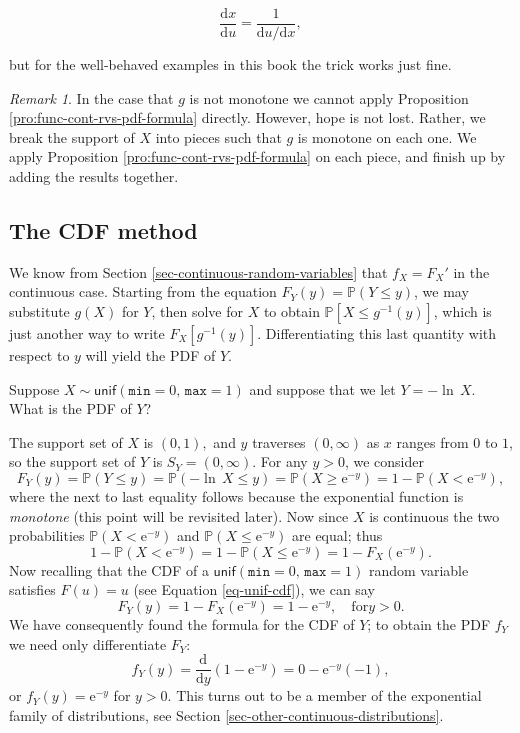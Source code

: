 \documentclass[]{book}
\numberwithin{equation}{chapter}
\numberwithin{figure}{chapter}
\theoremstyle{plain}
\theoremstyle{definition}
\theoremstyle{remark}
\theoremstyle{definition}
\theoremstyle{definition}
\theoremstyle{remark}
\newtheorem*{remark}{Remark}
\let\BeginKnitrBlock\begin \let\EndKnitrBlock\end
\begin{document}
\begin{equation}
\label{eq-univ-jacob-recip}
\frac{\mathrm{d} x}{\mathrm{d} u}=\frac{1}{\mathrm{d} u/\mathrm{d} x},
\end{equation}

but for the well-behaved examples in this book the trick works just
fine.

\bigskip

\begin{remark}
In the case that \(g\) is not monotone we cannot apply Proposition
\ref{pro:func-cont-rvs-pdf-formula} directly. However, hope is not lost.
Rather, we break the support of \(X\) into pieces such that \(g\) is
monotone on each one. We apply Proposition
\ref{pro:func-cont-rvs-pdf-formula} on each piece, and finish up by
adding the results together.
\end{remark}

\subsection{The CDF method}\label{the-cdf-method}

We know from Section \ref{sec-continuous-random-variables} that
\(f_{X}=F_{X}'\) in the continuous case. Starting from the equation
\(F_{Y}(y)=\mathbb{P}(Y\leq y)\), we may substitute \(g(X)\) for \(Y\),
then solve for \(X\) to obtain \(\mathbb{P}[X\leq g^{-1}(y)]\), which is
just another way to write \(F_{X}[g^{-1}(y)]\). Differentiating this
last quantity with respect to \(y\) will yield the PDF of \(Y\).

\bigskip

\BeginKnitrBlock{example}
\protect\hypertarget{ex:unnamed-chunk-281}{}{\label{ex:unnamed-chunk-281}}Suppose
\(X\sim\mathsf{unif}(\mathtt{min}=0,\,\mathtt{max}=1)\) and suppose that
we let \(Y=-\ln\, X\). What is the PDF of \(Y\)?
\EndKnitrBlock{example}

The support set of \(X\) is \((0,1),\) and \(y\) traverses
\((0,\infty)\) as \(x\) ranges from \(0\) to \(1\), so the support set
of \(Y\) is \(S_{Y}=(0,\infty)\). For any \(y>0\), we consider \[
F_{Y}(y)=\mathbb{P}(Y\leq y)=\mathbb{P}(-\ln\, X\leq
y)=\mathbb{P}(X\geq\mathrm{e}^{-y})=1-\mathbb{P}(X<\mathrm{e}^{-y}),
\] where the next to last equality follows because the exponential
function is \emph{monotone} (this point will be revisited later). Now
since \(X\) is continuous the two probabilities
\(\mathbb{P}(X<\mathrm{e}^{-y})\) and
\(\mathbb{P}(X\leq\mathrm{e}^{-y})\) are equal; thus \[ 1-\mathbb{P}(X
<
\mathrm{e}^{-y})=1-\mathbb{P}(X\leq\mathrm{e}^{-y})=1-F_{X}(\mathrm{e}^{-y}).
\] Now recalling that the CDF of a
\(\mathsf{unif}(\mathtt{min}=0,\,\mathtt{max}=1)\) random variable
satisfies \(F(u)=u\) (see Equation \eqref{eq-unif-cdf}), we can say \[
F_{Y}(y)=1-F_{X}(\mathrm{e}^{-y})=1-\mathrm{e}^{-y},\quad \mbox{for
}y>0.  \] We have consequently found the formula for the CDF of \(Y\);
to obtain the PDF \(f_{Y}\) we need only differentiate \(F_{Y}\): \[
f_{Y}(y)=\frac{\mathrm{d}}{\mathrm{d}
y}\left(1-\mathrm{e}^{-y}\right)=0-\mathrm{e}^{-y}(-1), \] or
\(f_{Y}(y)=\mathrm{e}^{-y}\) for \(y>0\). This turns out to be a member
of the exponential family of distributions, see Section
\ref{sec-other-continuous-distributions}.
\end{document}
